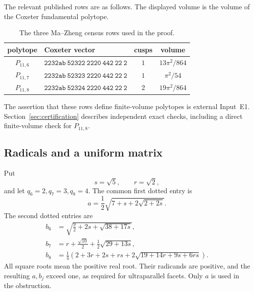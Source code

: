 \documentclass[11pt]{article}
\numberwithin{equation}{section}
\theoremstyle{definition}
\theoremstyle{remark}
\begin{document}
The relevant published rows are as follows.  The displayed volume is the
volume of the Coxeter fundamental polytope.

\begin{table}[ht]
\centering
\small
\begin{tabular}{@{}c l c c@{}}
\toprule
polytope & Coxeter vector & cusps & volume \\
\midrule
\(P_{11,6}\) & \(\mathtt{2232ab\ 52322\ 2220\ 442\ 22\ 2}\)
    & \(1\) & \(13\pi^2/864\) \\
\(P_{11,7}\) & \(\mathtt{2232ab\ 52323\ 2220\ 442\ 22\ 2}\)
    & \(1\) & \(\pi^2/54\) \\
\(P_{11,8}\) & \(\mathtt{2232ab\ 52324\ 2220\ 442\ 22\ 2}\)
    & \(2\) & \(19\pi^2/864\) \\
\bottomrule
\end{tabular}
\caption{The three Ma--Zheng census rows used in the proof.}
\label{tab:three-polytopes}
\end{table}

The assertion that these rows define finite-volume polytopes is external
Input~E1.  Section~\ref{sec:certification} describes independent exact checks,
including a direct finite-volume check for \(P_{11,8}\).

\subsection{Radicals and a uniform matrix}

Put
\[
 s=\sqrt5,\qquad r=\sqrt2,
\]
and let \(q_6=2,q_7=3,q_8=4\).  The common first dotted entry is
\begin{equation}
 a=\frac12\sqrt{7+s+2\sqrt{2+2s}}.
\label{eq:a-radical}
\end{equation}
The second dotted entries are
\begin{equation}
\begin{aligned}
 b_6&=\sqrt{\frac92+2s+\sqrt{38+17s}},\\
 b_7&=r+\frac{\sqrt{10}}2+\frac12\sqrt{29+13s},\\
 b_8&=\frac14\left(2+3r+2s+rs
       +2\sqrt{19+14r+9s+6rs}\right).
\end{aligned}
\label{eq:b-radicals}
\end{equation}
All square roots mean the positive real root.  Their radicands are positive,
and the resulting \(a,b_j\) exceed one, as required for ultraparallel
facets.  Only \(a\) is used in the obstruction.
\end{document}
